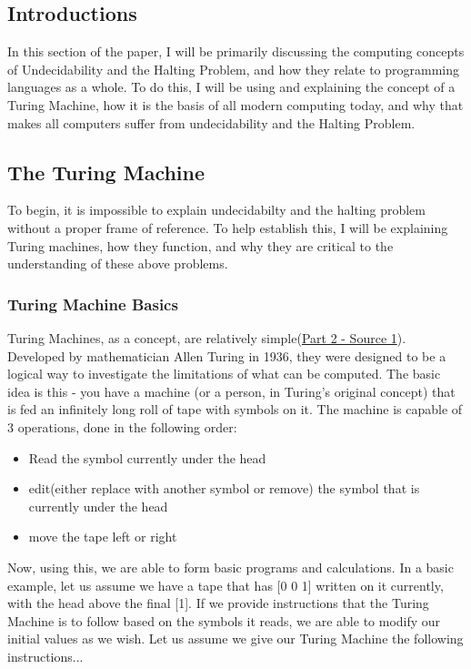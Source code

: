 \documentclass{article}
\begin{document}
\subsection{Introductions}
In this section of the paper, I will be primarily discussing the computing concepts of Undecidability and the Halting Problem, and how they relate to programming languages as a whole. To do this, I will be using and explaining the concept of a Turing Machine, how it is the basis of all modern computing today, and why that makes all computers suffer from undecidability and the Halting Problem. 
\subsection{The Turing Machine}
To begin, it is impossible to explain undecidabilty and the halting problem without a proper frame of reference. To help establish this, I will be explaining Turing machines, how they function, and why they are critical to the understanding of these above problems. 
    \subsubsection{Turing Machine Basics}
    
    \medskip\noindent Turing Machines, as a concept, are relatively simple(\href {https://www.cl.cam.ac.uk/projects/raspberrypi/tutorials/turing-machine/one.html}{Part 2 - Source 1}). Developed by mathematician Allen Turing in 1936, they were designed to be a logical way to investigate the limitations of what can be computed. The basic idea is this - you have a machine (or a person, in Turing's original concept) that is fed an infinitely long roll of tape with symbols on it. The machine is capable of 3 operations, done in the following order:
    \begin{itemize}
        \item Read the symbol currently under the head
        \item edit(either replace with another symbol or remove) the symbol that is currently under the head
        \item move the tape left or right
    \end{itemize}
    
    \medskip\noindent Now, using this, we are able to form basic programs and calculations. In a basic example, let us assume we have a tape that has [0 0 1] written on it currently, with the head above the final [1]. If we provide instructions that the Turing Machine is to follow based on the symbols it reads, we are able to modify our initial values as we wish. Let us assume we give our Turing Machine the following instructions...
    
\end{document}
